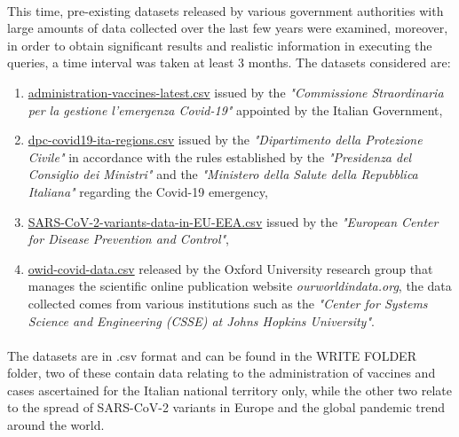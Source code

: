 \documentclass[a4paper,12pt]{article}
\begin{document}
\paragraph{} This time, pre-existing datasets released by various government authorities with large amounts of data collected over the last few years were examined, moreover, in order to obtain significant results and realistic information in executing the queries, a time interval was taken at least 3 months. The datasets considered are:
  \begin{enumerate}[noitemsep]
    \item \href{https://raw.githubusercontent.com/italia/covid19-opendata-vaccini/master/dati/somministrazioni-vaccini-latest.csv}{administration-vaccines-latest.csv} issued by the \emph{"Commissione Straordinaria per la gestione l’emergenza Covid-19"} appointed by the Italian Government,
    \item \href{https://raw.githubusercontent.com/pcm-dpc/COVID-19/master/dati-regioni/dpc-covid19-ita-regioni.csv}{dpc-covid19-ita-regions.csv} issued by the \emph{"Dipartimento della Protezione Civile"} in accordance with the rules established by the \emph{"Presidenza del Consiglio dei Ministri"} and the \emph{"Ministero della Salute della Repubblica Italiana"} regarding the Covid-19 emergency,
    \item \href{https://www.ecdc.europa.eu/en/publications-data/data-virus-variants-covid-19-eueea}{SARS-CoV-2-variants-data-in-EU-EEA.csv} issued by the \emph{"European Center for Disease Prevention and Control"},
    \item \href{https://raw.githubusercontent.com/owid/covid-19-data/master/public/data/owid-covid-data.csv}{owid-covid-data.csv} released by the Oxford University research group that manages the scientific online publication website \emph{ourworldindata.org}, the data collected comes from various institutions such as the \emph{"Center for Systems Science and Engineering (CSSE) at Johns Hopkins University"}.
   \end{enumerate}
\paragraph{} The datasets are in .csv format and can be found in the WRITE FOLDER folder, two of these contain data relating to the administration of vaccines and cases ascertained for the Italian national territory only, while the other two relate to the spread of SARS-CoV-2 variants in Europe and the global pandemic trend around the world.
\end{document}
